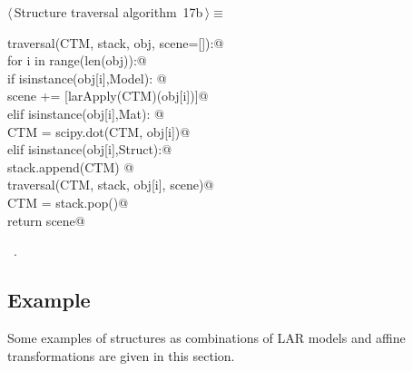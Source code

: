 \documentclass[11pt,oneside]{article}	%
\begin{document}
\begin{flushleft} \small \label{scrap32}
\protect{}$\langle\,$Structure traversal algorithm\nobreak\ {\footnotesize 17b}$\,\rangle\equiv$
\vspace{-1ex}
\begin{list}{}{} \item
\mbox{}\verb@def traversal(CTM, stack, obj, scene=[]):@\\
\mbox{}\verb@    for i in range(len(obj)):@\\
\mbox{}\verb@        if isinstance(obj[i],Model): @\\
\mbox{}\verb@            scene += [larApply(CTM)(obj[i])]@\\
\mbox{}\verb@        elif isinstance(obj[i],Mat): @\\
\mbox{}\verb@            CTM = scipy.dot(CTM, obj[i])@\\
\mbox{}\verb@        elif isinstance(obj[i],Struct):@\\
\mbox{}\verb@            stack.append(CTM) @\\
\mbox{}\verb@            traversal(CTM, stack, obj[i], scene)@\\
\mbox{}\verb@            CTM = stack.pop()@\\
\mbox{}\verb@    return scene@\\
\mbox{}\verb@@{\NWsep}
\end{list}
\vspace{-1ex}
\footnotesize\addtolength{\baselineskip}{-1ex}
\begin{list}{}{\setlength{\itemsep}{-\parsep}\setlength{\itemindent}{-\leftmargin}}
\item \NWtxtMacroRefIn\ .
\end{list}
\end{flushleft}


\subsection{Example}
Some examples of structures as combinations of LAR models and affine transformations are given in this section. 
\end{document}
